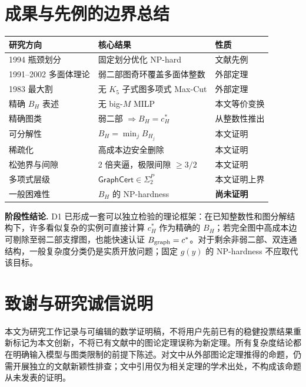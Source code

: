 \documentclass[11pt,a4paper]{ctexart}
\theoremstyle{definition}
\newcommand{\GraphCert}{\mathsf{GraphCert}}
\newcommand{\1}{\boldsymbol 1}
\begin{document}
\section{成果与先例的边界总结}
\begin{center}
\small
\begin{tabularx}{\linewidth}{@{}p{.27\linewidth}X p{.23\linewidth}@{}}
\toprule
研究方向 & 核心结果 & 性质\\
\midrule
1994 瓶颈划分 & 固定划分优化 NP-hard & 文献先例\cite{ShahrokhiSzekely1994}\\
1991--2002 多面体理论 & 弱二部图奇环覆盖多面体整数 & 外部定理\cite{Guenin2001,Schrijver2002}\\
1983 最大割 & 无 $K_5$ 子式图多项式 Max-Cut & 外部定理\cite{Barahona1983}\\
精确 $B_H$ 表述 & 无 big-$M$ MILP & 本文等价变换\\
精确图类 & 弱二部 $\Rightarrow B_H=c_H^*$ & 从整数性推出\\
可分解性 & $B_H=\min_j B_{H_j}$ & 本文证明\\
稀疏化 & 高成本边安全删除 & 本文证明\\
松弛界与间隙 & 2 倍夹逼，极限间隙 $\ge3/2$ & 本文证明\\
多项式层级 & $\GraphCert\in\Sigma_2^P$ & 本文证明上界\\
一般困难性 & $B_H$ 的 NP-hardness & \textbf{尚未证明}\\
\bottomrule
\end{tabularx}
\end{center}

\begin{resultbox}
\textbf{阶段性结论.} D1 已形成一套可以独立检验的理论框架：在已知整数性和图分解结构下，许多看似复杂的实例可直接计算 $c_H^*$ 作为精确的 $B_H$；若完全图中高成本边可剔除至弱二部支撑图，也能快速认证 $B_{\rm graph}=c^*$。对于剩余非弱二部、双连通结构，一般复杂度分类仍是实质开放问题；固定 $g(y)$ 的 NP-hardness 不应取代该目标。
\end{resultbox}

\section*{致谢与研究诚信说明}
本文为研究工作记录与可编辑的数学证明稿，不将用户先前已有的稳健投票结果重新标记为本文创新，不将已有文献中的图论定理误称为新定理。所有复杂度结论都在明确输入模型与图类限制的前提下陈述。对文中从外部图论定理推得的命题，仍需开展独立的文献新颖性排查；文中引用仅为相关定理的学术出处，不构成该命题从未发表的证明。
\end{document}
